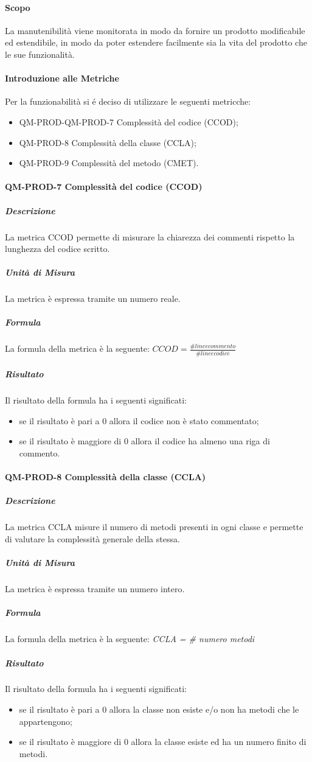 		\paragraph{Scopo}
			La manutenibilità viene monitorata in modo da fornire un prodotto modificabile ed estendibile, in modo da poter estendere facilmente sia la vita del prodotto che le sue funzionalità.
		\paragraph{Introduzione alle Metriche}
			Per la funzionabilità si é deciso di utilizzare le seguenti metricche:
			\begin{itemize}
				\item QM-PROD-QM-PROD-7 Complessità del codice (CCOD);
				\item QM-PROD-8 Complessità della classe (CCLA);
				\item QM-PROD-9 Complessità del metodo (CMET).
			\end{itemize}
		\paragraph{QM-PROD-7 Complessità del codice (CCOD)}
			\subparagraph{Descrizione}
				La metrica CCOD permette di misurare la chiarezza dei commenti rispetto la lunghezza del codice scritto.
			\subparagraph{Unità di Misura}
				La metrica è espressa tramite un numero reale.
			\subparagraph{Formula}
				La formula della metrica è la seguente:
			 \(
			 		CCOD = \frac{\# linee commento}{\# linee codice}
			 \)
			\subparagraph{Risultato}
				Il risultato della formula ha i seguenti significati:
				\begin{itemize}
					\item se il risultato è pari a 0 allora il codice non è stato commentato;
					\item se il risultato è maggiore di 0 allora il codice ha almeno una riga di commento.
				\end{itemize}
		\paragraph{QM-PROD-8 Complessità della classe (CCLA)}
			\subparagraph{Descrizione}
				La metrica CCLA misure il numero di metodi presenti in ogni classe e permette di valutare la complessità generale della stessa.
			\subparagraph{Unità di Misura}
				La metrica è espressa tramite un numero intero.
			\subparagraph{Formula}
				La formula della metrica è la seguente:
				\textit{CCLA = \# numero metodi}
			\subparagraph{Risultato}
				Il risultato della formula ha i seguenti significati:
				\begin{itemize}
					\item se il risultato è pari a 0 allora la classe non esiste e/o non ha metodi che le appartengono;
					\item se il risultato è maggiore di 0  allora la classe esiste ed ha un numero finito di metodi.
				\end{itemize}
